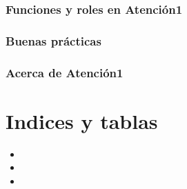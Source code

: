 \documentclass[letterpaper,10pt,spanish]{sphinxmanual}
\begin{document}
\subsection{Funciones y roles en Atención\sphinxhyphen{}1}
\label{\detokenize{roles_funciones:funciones-y-roles-en-atencion-1}}\label{\detokenize{roles_funciones::doc}}

\subsection{Buenas prácticas}
\label{\detokenize{buenas_pr_xe1cticas:buenas-practicas}}\label{\detokenize{buenas_pr_xe1cticas::doc}}

\subsection{Acerca de Atención\sphinxhyphen{}1}
\label{\detokenize{about:acerca-de-atencion-1}}\label{\detokenize{about::doc}}

\chapter{Indices y tablas}
\label{\detokenize{index:indices-y-tablas}}\begin{itemize}
\item {} 

\item {} 

\item {} 

\end{itemize}



\renewcommand{\indexname}{Índice}
\printindex
\end{document}
